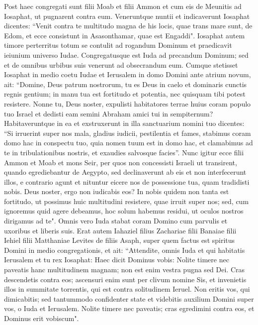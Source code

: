 \begin{biblechapter}  
\verse Post haec congregati sunt filii Moab et filii Ammon et cum eis de Meunitis ad Iosaphat, ut pugnarent contra eum. 
\verse Veneruntque nuntii et indicaverunt Iosaphat dicentes: “Venit contra te multitudo magna de his locis, quae trans mare sunt, de Edom, et ecce consistunt in Asasonthamar, quae est Engaddi". 
\verse Iosaphat autem timore perterritus totum se contulit ad rogandum Dominum et praedicavit ieiunium universo Iudae. 
\verse Congregatusque est Iuda ad precandum Dominum; sed et de omnibus urbibus suis venerunt ad obsecrandum eum. 
\verse Cumque stetisset Iosaphat in medio coetu Iudae et Ierusalem in domo Domini ante atrium novum, 
\verse ait: “Domine, Deus patrum nostrorum, tu es Deus in caelo et dominaris cunctis regnis gentium; in manu tua est fortitudo et potentia, nec quisquam tibi potest resistere. 
\verse Nonne tu, Deus noster, expulisti habitatores terrae huius coram populo tuo Israel et dedisti eam semini Abraham amici tui in sempiternum? 
\verse Habitaveruntque in ea et exstruxerunt in illa sanctuarium nomini tuo dicentes: 
\verse “Si irruerint super nos mala, gladius iudicii, pestilentia et fames, stabimus coram domo hac in conspectu tuo, quia nomen tuum est in domo hac, et clamabimus ad te in tribulationibus nostris, et exaudies salvosque facies”. 
\verse Nunc igitur ecce filii Ammon et Moab et mons Seir, per quos non concessisti Israeli ut transirent, quando egrediebantur de Aegypto, sed declinaverunt ab eis et non interfecerunt illos, 
\verse e contrario agunt et nituntur eicere nos de possessione tua, quam tradidisti nobis. 
\verse Deus noster, ergo non iudicabis eos? In nobis quidem non tanta est fortitudo, ut possimus huic multitudini resistere, quae irruit super nos; sed, cum ignoremus quid agere debeamus, hoc solum habemus residui, ut oculos nostros dirigamus ad te". 
\verse Omnis vero Iuda stabat coram Domino cum parvulis et uxoribus et liberis suis. 
\verse Erat autem Iahaziel filius Zachariae filii Banaiae filii Iehiel filii Matthaniae Levites de filiis Asaph, super quem factus est spiritus Domini in medio congregationis, 
\verse et ait: “Attendite, omnis Iuda et qui habitatis Ierusalem et tu rex Iosaphat: Haec dicit Dominus vobis: Nolite timere nec paveatis hanc multitudinem magnam; non est enim vestra pugna sed Dei. 
\verse Cras descendetis contra eos; ascensuri enim sunt per clivum nomine Sis, et invenietis illos in summitate torrentis, qui est contra solitudinem Ieruel.  
\verse Non eritis vos, qui dimicabitis; sed tantummodo confidenter state et videbitis auxilium Domini super vos, o Iuda et Ierusalem. Nolite timere nec paveatis; cras egredimini contra eos, et Dominus erit vobiscum". 

\end{biblechapter}

